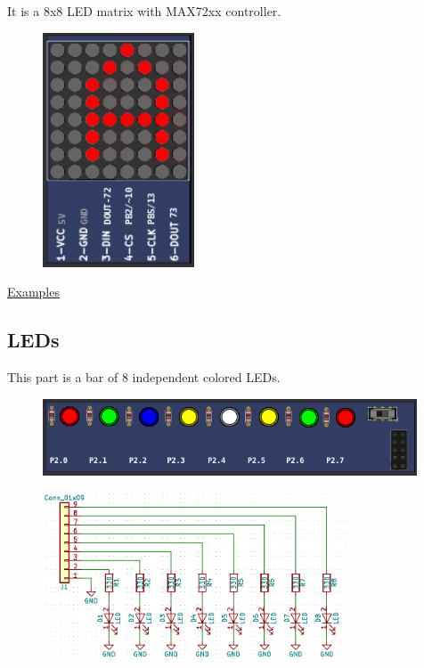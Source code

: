 It is a 8x8 LED matrix with MAX72xx controller.

\begin{figure}[H]
\center
\includegraphics[width=0.4\textwidth]{img/part_LED_matrix.png} 
\end{figure}

\href{https://lcgamboa.github.io/picsimlab_examples/parts_LED_Matrix.html}{Examples}

\subsection{LEDs}

This part is a bar of 8 independent colored LEDs.

\begin{figure}[H]
\center
\includegraphics[width=0.99\textwidth]{img/part_leds.png} 
\end{figure} 

\begin{figure}[H]
\center
\includegraphics[width=0.8\textwidth]{img/part_leds_.png} 
\end{figure} 

